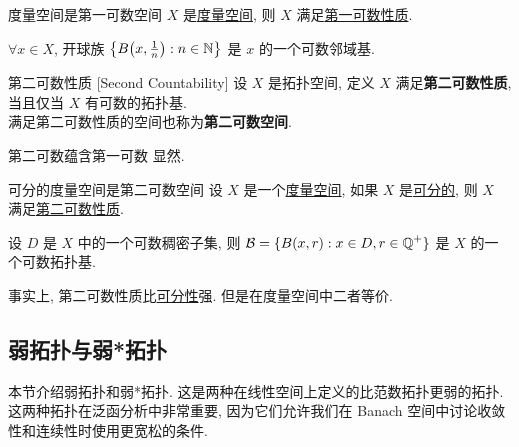         \begin{thm}
            {度量空间是第一可数空间}
            \(X\) 是\hyperref[dfn:ms]{度量空间}, 则 \(X\) 满足\hyperref[dfn:first-countable]{第一可数性质}.
        \end{thm}

        \begin{prf}
            \(\forall x\in X\), 开球族 \(\qty{B\qty(x,\frac{1}{n}):n\in\operatorname{\mathbb{N}}}\) 是 \(x\) 的一个可数邻域基.
        \end{prf}

        \begin{vardfn}
            {第二可数性质}
            [Second Countability]
            设 \(X\) 是拓扑空间, 定义 \(X\) 满足\textbf{第二可数性质}, 当且仅当 \(X\) 有可数的拓扑基. \\
            满足第二可数性质的空间也称为\textbf{第二可数空间}.
        \end{vardfn}

        \begin{varthm}
            {第二可数蕴含第一可数}
            显然.
        \end{varthm}

        \begin{varthm}
            {可分的度量空间是第二可数空间}
            设 \(X\) 是一个\hyperref[dfn:ms]{度量空间}, 如果 \(X\) 是\hyperref[dfn:separable]{可分的}, 则 \(X\) 满足\hyperref[dfn:second-countable]{第二可数性质}.
        \end{varthm}

        \begin{prf}
            设 \(D\) 是 \(X\) 中的一个可数稠密子集, 则 \(\operatorname{\mathcal{B}}=\{B(x,r):x\in D, r\in\operatorname{\mathbb{Q}}^+\}\) 是 \(X\) 的一个可数拓扑基.
        \end{prf}

        \begin{rmk}
            [Dedicatia]
            事实上, 第二可数性质比\hyperref[dfn:separable]{可分性}强. 但是在度量空间中二者等价.
        \end{rmk}

    \subsection{弱拓扑与弱*拓扑}

        \begin{intrormk}
            [Dedicatia]
            本节介绍弱拓扑和弱*拓扑. 这是两种在线性空间上定义的比范数拓扑更弱的拓扑. 这两种拓扑在泛函分析中非常重要, 因为它们允许我们在 Banach 空间中讨论收敛性和连续性时使用更宽松的条件.
        \end{intrormk}

